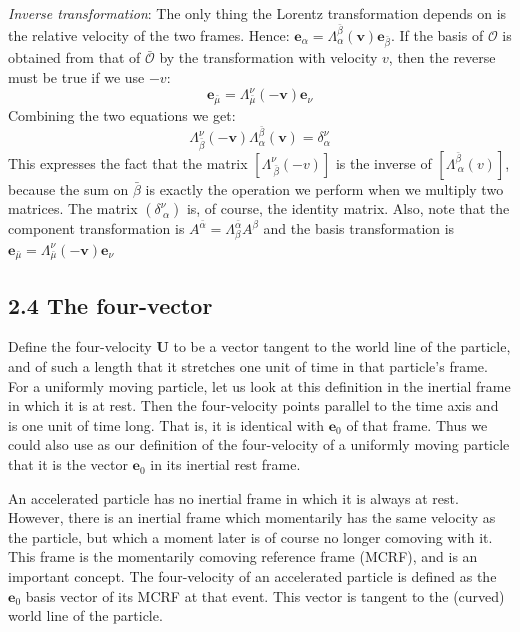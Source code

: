 \documentclass[12pt]{book}
\begin{document}
        \textit{Inverse transformation}: The only thing the Lorentz transformation depends on is the relative velocity of the two frames. Hence: \(    \mathbf{e}_\alpha=\Lambda^{\bar{\beta}}_\alpha(\bm{v}) \mathbf{e}_{\bar{\beta}}\). If the basis of \(\mathcal{O}\) is obtained from that of \(\mathcal{\bar{O}}\) by the transformation with velocity \(v\), then the reverse must be true if we use \(-v\):
        \[
            \mathbf{e}_\bar{\mu}=\Lambda^{\nu}_\bar{\mu}(\bm{-v}) \mathbf{e}_{\nu}
        \]
        Combining the two equations we get:
        \[
            \Lambda^{\nu}_\bar{\beta} (\bm{-v}) \Lambda^{\bar{\beta}}_\alpha (\bm{v}) = \delta^\nu_\alpha
        \]
        This expresses the fact that the matrix \([\Lambda^\nu_{\ \bar{\beta}}(-v)]\) is the inverse of \([\Lambda^{\bar{\beta}}_{\ \alpha}(v)]\), because the sum on \(\bar{\beta}\) is exactly the operation we perform when we multiply two matrices. The matrix \((\delta^\nu_{\ \alpha})\) is, of course, the identity matrix. Also, note that the component transformation is \(A^{\bar{\alpha}}=\Lambda^{\bar{\alpha}}_\beta A^\beta\) and the basis transformation is \(\mathbf{e}_\bar{\mu}=\Lambda^{\nu}_\bar{\mu}(\bm{-v}) \mathbf{e}_{\nu}\)

    \subsection{2.4 The four-vector}

        Define the four-velocity \( \mathbf{U} \) to be a vector tangent to the world line of the particle, and of such a length that it stretches one unit of time in that particle’s frame. For a uniformly moving particle, let us look at this definition in the inertial frame in which it is at rest. Then the four-velocity points parallel to the time axis and is one unit of time long. That is, it is identical with \( \mathbf{e}_0 \) of that frame. Thus we could also use as our definition of the four-velocity of a uniformly moving particle that it is the vector \( \mathbf{e}_0 \) in its inertial rest frame.

        An accelerated particle has no inertial frame in which it is always at rest. However, there is an inertial frame which momentarily has the same velocity as the particle, but which a moment later is of course no longer comoving with it. This frame is the momentarily comoving reference frame (MCRF), and is an important concept. The four-velocity of an accelerated particle is defined as the \( \mathbf{e}_0 \) basis vector of its MCRF at that event. This vector is tangent to the (curved) world line of the particle.
\end{document}
